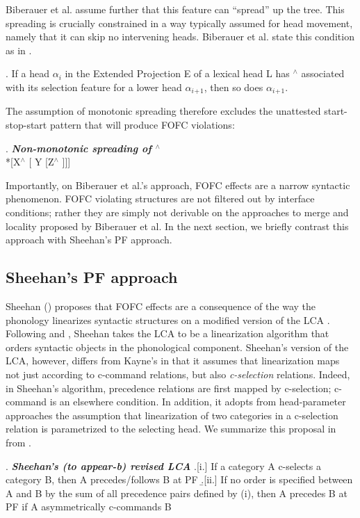 \documentclass[output=paper]{langscibook}
\begin{document}
	Biberauer et al. assume further that this feature can ``spread'' up the tree.  This spreading is crucially constrained in a way typically assumed for head movement, namely that it can skip no intervening heads.  Biberauer et al. state this condition as in \Next.
  
\ex. 	If a head $\alpha_i$ in the Extended Projection E of a lexical head L has $^\wedge$ associated
with its selection feature for a lower head $\alpha$$_i$$_+$$_1$, then so does $\alpha_i$$_+$$_1$.
	
	The assumption of monotonic spreading therefore excludes the unattested start-stop-start pattern that will produce FOFC violations:

\ex. \textbf{\textit{Non-monotonic spreading of $^\wedge$}} \\ \protect\label{wedge} *[X$^\wedge$  [ Y [Z$^\wedge$ ]]]


	Importantly, on Biberauer et al.'s approach, FOFC effects are a narrow syntactic phenomenon. FOFC violating structures are not filtered out by interface conditions; rather they are simply not derivable on the approaches to merge and locality proposed by Biberauer et al.  In the next section, we briefly contrast this approach with Sheehan's PF approach.
	
\subsection{Sheehan's PF approach} \protect\label{sheehanpf}
	Sheehan (\citeyear{sheehan2013, sheehan2012, sheehan2012b}) proposes that FOFC effects are a consequence of the way the phonology linearizes syntactic structures on a modified version of the LCA \cite{kayne1994}.   Following \cite{chomsky1995} and \cite{nunes2004}, Sheehan takes the LCA to be a linearization algorithm that orders syntactic objects in the phonological component. Sheehan's version of the LCA, however, differs from Kayne's in that it assumes that  linearization maps not just according to c-command relations, but also \textit{c-selection} relations.  Indeed, in Sheehan's algorithm, precedence relations are first mapped by c-selection; c-command is an elsewhere condition.  In addition, it adopts from head-parameter approaches the assumption that linearization of two categories in a c-selection relation is parametrized to the selecting head.  We summarize this proposal in \Next from \cite{sheehan2012}.
	
\ex. \textbf{\textit{Sheehan's (to appear-b) revised LCA}}  \protect\label{lca}
\a.[i.] If a category A c-selects a category B, then A precedes/follows B at PF
\b.[ii.] If no order is specified between A and B by the sum of all precedence pairs
defined by (i), then A precedes B at PF if A asymmetrically c-commands B	
	
\end{document}
